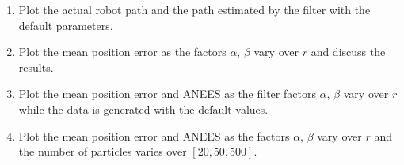 \documentclass[tp]{lcc}
\begin{document}
\begin{enumerate}
\item Plot the actual robot path and the path estimated by the filter with the default parameters.
\item Plot the mean position error as the factors $\alpha$, $\beta$ vary over $r$ and discuss the results.
\item Plot the mean position error and ANEES as the filter factors $\alpha$, $\beta$ vary over $r$ while the data is generated with the default values.
\item Plot the mean position error and ANEES as the factors $\alpha$, $\beta$ vary over $r$ and the number of particles varies over $[20, 50, 500]$.
\end{enumerate}

	\printbibliography
	
\end{document}
